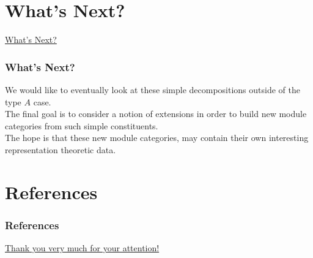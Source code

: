 \documentclass{beamer}
\begin{document}

\section{What's Next?}

\begin{frame}
\noindent\centerline{\LARGE\textcolor{structure}{\underline{What's Next?}}}
\end{frame}

\begin{frame}
\frametitle{What's Next?}
We would like to eventually look at these simple decompositions outside of the type $A$ case.\\[2ex]

The final goal is to consider a notion of extensions in order to build new module categories from such simple constituents.\\[2ex]

The hope is that these new module categories, may contain their own interesting representation theoretic data.
\end{frame}


\section*{References}

\begin{frame}[allowframebreaks]
\frametitle{References}
\printbibliography[heading = none]
\end{frame}


\begin{frame}
\noindent\centerline{\LARGE\textcolor{structure}{\underline{Thank you very much for your attention!}}}
\end{frame}
\end{document}
